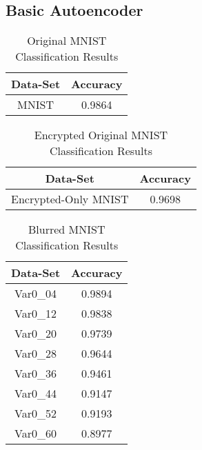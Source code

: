 \documentclass[12pt, titlepage]{article}
\begin{document}
~\newpage
\subsection{Basic Autoencoder} 

\begin{table}[!h]
	\begin{center}
		\begin{tabular}{| c | c |}
			\hline
			\textbf{Data-Set} & \textbf{Accuracy}\\
			\hline
			MNIST & 0.9864\\
			\hline
		\end{tabular}
		\caption{Original MNIST Classification Results}
		\label{table:basicAE_MNIST}
	\end{center}
\end{table}

\begin{table}[!h]
	\begin{center}
		\begin{tabular}{| c | c |}
			\hline
			\textbf{Data-Set} & \textbf{Accuracy}\\
			\hline
			Encrypted-Only MNIST & 0.9698\\
			\hline
		\end{tabular}
		\caption{Encrypted Original MNIST Classification Results}
		\label{table:basicAE_Encryption}
	\end{center}
\end{table}

\begin{table}[!h]
	\begin{center}
		\begin{tabular}{| c | c |}
			\hline
			\textbf{Data-Set} & \textbf{Accuracy}\\
			\hline
			Var0\_04 & 0.9894\\
			\hline
			Var0\_12 & 0.9838\\
			\hline
			Var0\_20 & 0.9739\\
			\hline
			Var0\_28 & 0.9644\\
			\hline
			Var0\_36 & 0.9461\\
			\hline
			Var0\_44 & 0.9147\\
			\hline
			Var0\_52 & 0.9193\\
			\hline
			Var0\_60 & 0.8977\\
			\hline
		\end{tabular}
		\caption{Blurred MNIST Classification Results}
		\label{table:basicAE_Blurred}
	\end{center}
\end{table}
\end{document}
